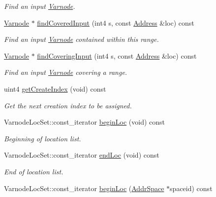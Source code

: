 \begin{DoxyCompactItemize}
\begin{DoxyCompactList}\small\item\em Find an input \mbox{\hyperlink{class_varnode}{Varnode}}. \end{DoxyCompactList}\item 
\mbox{\hyperlink{class_varnode}{Varnode}} $\ast$ \mbox{\hyperlink{class_varnode_bank_aacfc015d8ce76e8f1cacd6da9c7cd93f}{find\+Covered\+Input}} (int4 s, const \mbox{\hyperlink{class_address}{Address}} \&loc) const
\begin{DoxyCompactList}\small\item\em Find an input \mbox{\hyperlink{class_varnode}{Varnode}} contained within this range. \end{DoxyCompactList}\item 
\mbox{\hyperlink{class_varnode}{Varnode}} $\ast$ \mbox{\hyperlink{class_varnode_bank_ae582ca41dcfbcb24895320c371113052}{find\+Covering\+Input}} (int4 s, const \mbox{\hyperlink{class_address}{Address}} \&loc) const
\begin{DoxyCompactList}\small\item\em Find an input \mbox{\hyperlink{class_varnode}{Varnode}} covering a range. \end{DoxyCompactList}\item 
uint4 \mbox{\hyperlink{class_varnode_bank_ab89d4b8688f2195cbdd4fd3a2b004f47}{get\+Create\+Index}} (void) const
\begin{DoxyCompactList}\small\item\em Get the next creation index to be assigned. \end{DoxyCompactList}\item 
Varnode\+Loc\+Set\+::const\+\_\+iterator \mbox{\hyperlink{class_varnode_bank_adbb6ea3ddaec68864cb408ad45eeb66d}{begin\+Loc}} (void) const
\begin{DoxyCompactList}\small\item\em Beginning of location list. \end{DoxyCompactList}\item 
Varnode\+Loc\+Set\+::const\+\_\+iterator \mbox{\hyperlink{class_varnode_bank_a6b8d7eeeab4dd2dd9fe87905773ed3cc}{end\+Loc}} (void) const
\begin{DoxyCompactList}\small\item\em End of location list. \end{DoxyCompactList}\item 
Varnode\+Loc\+Set\+::const\+\_\+iterator \mbox{\hyperlink{class_varnode_bank_a58e2a7364cd253c9dc935233269a9bb2}{begin\+Loc}} (\mbox{\hyperlink{class_addr_space}{Addr\+Space}} $\ast$spaceid) const

\end{DoxyCompactItemize}
